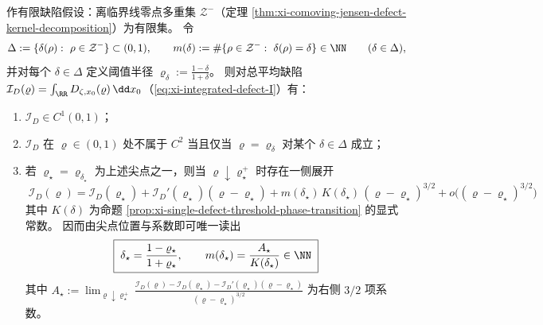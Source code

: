 \begin{theorem}[有限缺陷口径下的尖点定位与离线偏移谱读出]\label{thm:xi-integrated-defect-cusp-reconstruction}
作有限缺陷假设：离临界线零点多重集 \(\mathcal{Z}^-\)（定理 \ref{thm:xi-comoving-jensen-defect-kernel-decomposition}）为有限集。
令
\[
\Delta:=\{\delta(\rho):\ \rho\in\mathcal{Z}^-\}\subset(0,1),
\qquad
m(\delta):=\#\{\rho\in\mathcal{Z}^-:\ \delta(\rho)=\delta\}\in\NN\qquad(\delta\in\Delta),
\]
并对每个 \(\delta\in\Delta\) 定义阈值半径 \(\varrho_\delta:=\frac{1-\delta}{1+\delta}\)。
则对总平均缺陷 \(\mathcal{I}_D(\varrho)=\int_{\RR}D_{\zeta,x_0}(\varrho)\,\dd x_0\)（\eqref{eq:xi-integrated-defect-I}）有：
\begin{enumerate}
  \item \(\mathcal{I}_D\in C^1(0,1)\)；
  \item \(\mathcal{I}_D\) 在 \(\varrho\in(0,1)\) 处不属于 \(C^2\) 当且仅当 \(\varrho=\varrho_\delta\) 对某个 \(\delta\in\Delta\) 成立；
  \item 若 \(\varrho_\star=\varrho_{\delta_\star}\) 为上述尖点之一，则当 \(\varrho\downarrow \varrho_\star^+\) 时存在一侧展开
  \begin{equation}\label{eq:xi-integrated-defect-cusp-expansion}
  \boxed{\;
  \mathcal{I}_D(\varrho)
  =\mathcal{I}_D(\varrho_\star)+\mathcal{I}_D'(\varrho_\star)(\varrho-\varrho_\star)
  +m(\delta_\star)\,K(\delta_\star)\,(\varrho-\varrho_\star)^{3/2}
  +o\!\big((\varrho-\varrho_\star)^{3/2}\big)\;}
  \end{equation}
  其中 \(K(\delta)\) 为命题 \ref{prop:xi-single-defect-threshold-phase-transition} 的显式常数。
  因而由尖点位置与系数即可唯一读出
  \[
  \boxed{\;
  \delta_\star=\frac{1-\varrho_\star}{1+\varrho_\star},
  \qquad
  m(\delta_\star)=\frac{A_\star}{K(\delta_\star)}\in\NN\;
  }
  \]
  其中
  \(
  A_\star
  :=\lim_{\varrho\downarrow \varrho_\star^+}
  \frac{\mathcal{I}_D(\varrho)-\mathcal{I}_D(\varrho_\star)-\mathcal{I}_D'(\varrho_\star)(\varrho-\varrho_\star)}{(\varrho-\varrho_\star)^{3/2}}
  \)
  为右侧 \(3/2\) 项系数。
\end{enumerate}
\end{theorem}
